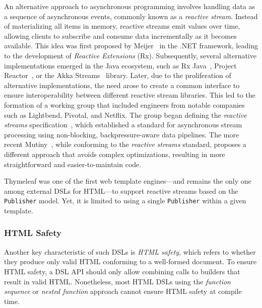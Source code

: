 \documentclass[software,article,accept,pdftex,moreauthors]{Definitions/mdpi}
\begin{document}
An alternative approach to asynchronous programming involves handling data as
a sequence of asynchronous events, commonly known as a \textit{reactive stream}.
Instead of materializing all items in memory, reactive streams emit values over
time, allowing clients to subscribe and consume data incrementally as it becomes
available.
This idea was first proposed by Meijer~\cite{rx-observable} in the .NET
framework, leading to the development of \textit{Reactive Extensions} (Rx).
Subsequently, several alternative implementations emerged in the Java ecosystem,
such as Rx Java~\cite{rxjava}, Project Reactor~\cite{projectreactor}, or the
Akka Streams~\cite{akka} library.
Later, due to the proliferation of alternative implementations, the need arose to
create a common interface to ensure interoperability between different reactive
stream libraries. This led to the formation of a working group that included
engineers from notable companies such as Lightbend, Pivotal, and Netflix.
The group began defining the \textit{reactive streams}
specification~\cite{ReactiveStreams}, which established a standard for
asynchronous stream processing using non-blocking, backpressure-aware data
pipelines.
The more recent Mutiny~\cite{mutiny2021}, while conforming to the
\textit{reactive streams} standard, proposes a different approach that avoids
complex optimizations, resulting in more straightforward and easier-to-maintain
code.

Thymeleaf was one of the first web template engines---and remains the only one
among external DSLs for HTML---to support reactive streams based on the
\texttt{Publisher} model. Yet, it is limited to using a single
\texttt{Publisher} within a given template.


\subsubsection{HTML Safety}\label{s2.1.4}

Another key characteristic of such DSLs is \textit{HTML safety}, which refers
to whether they produce only valid HTML conforming to a well-formed document.
To ensure HTML safety, a DSL API should only allow combining calls to builders
that result in valid HTML. Nonetheless, most HTML DSLs using the \textit{function
  sequence} or \textit{nested function} approach cannot ensure HTML safety at
compile time.
\end{document}
